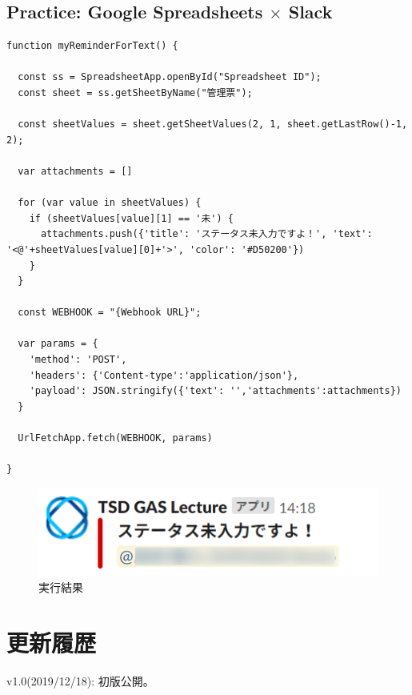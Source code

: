 \documentclass[uplatex,a4j]{jsarticle}
\begin{document}
\subsection{Practice: Google Spreadsheets $\times$ Slack}


\begin{lstlisting}[basicstyle=\ttfamily\footnotesize,frame=single,caption=Script Example for Spreadsheets practice]
function myReminderForText() {
  
  const ss = SpreadsheetApp.openById("Spreadsheet ID");
  const sheet = ss.getSheetByName("管理票");
  
  const sheetValues = sheet.getSheetValues(2, 1, sheet.getLastRow()-1, 2);
  
  var attachments = []
  
  for (var value in sheetValues) {
    if (sheetValues[value][1] == '未') {
      attachments.push({'title': 'ステータス未入力ですよ！', 'text': '<@'+sheetValues[value][0]+'>', 'color': '#D50200'})
    }
  }
  
  const WEBHOOK = "{Webhook URL}";
  
  var params = {
    'method': 'POST',
    'headers': {'Content-type':'application/json'},
    'payload': JSON.stringify({'text': '','attachments':attachments})
  }
  
  UrlFetchApp.fetch(WEBHOOK, params)

}
\end{lstlisting}

\begin{figure}[H]
 \centering
 \includegraphics[keepaspectratio, scale=0.7]{images/spreadsheet_practice_exec_example.png}
 \caption{実行結果}
 \label{fig:spreadsheet_practice_exec_example}
\end{figure}

\section{更新履歴}

v1.0(2019/12/18): 初版公開。
\end{document}
